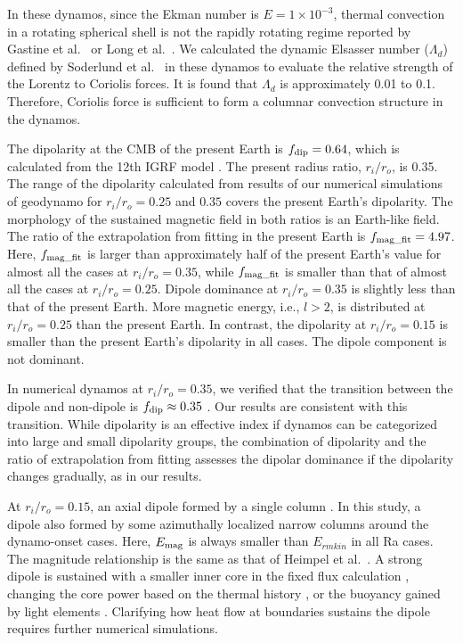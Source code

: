 {\color{red}
In these dynamos, since the Ekman number is $E = 1 \times 10^{-3}$, thermal convection in a rotating spherical shell is not the rapidly rotating regime reported by Gastine et al.\   or Long et al.\ . 
We calculated the dynamic Elsasser number ($\Lambda_d$) defined by Soderlund et al.\  in these dynamos to evaluate the relative strength of the Lorentz to Coriolis forces. 
It is found that $\Lambda_d$ is approximately 0.01 to 0.1. 
Therefore, Coriolis force is sufficient to form a columnar convection structure in the dynamos.
}

The dipolarity at the CMB of the present Earth is $f_{\rm dip} = 0.64$, which is calculated from the 12th IGRF model \cite{Thebault:2015}. 
The present radius ratio, $r_i/r_o$, is 0.35. 
The range of the dipolarity calculated from results of our numerical simulations of geodynamo for $r_i/r_o  = 0.25$ and $0.35$ covers the present Earth's dipolarity. 
The morphology of the sustained magnetic field in both ratios is an Earth-like field. 
The ratio of the extrapolation from fitting in the present Earth is $f_{\rm mag\_fit} = 4.97$. 
Here, $f_{\rm mag\_fit}$ is larger than approximately half of the present Earth's value for almost all the cases at $r_i/r_o = 0.35$, while $f_{\rm mag\_fit}$ is smaller than that of almost all the cases at $r_i/r_o = 0.25$. 
Dipole dominance at $r_i/r_o = 0.35$ is slightly less than that of the present Earth. 
More magnetic energy, i.e., $l > 2$, is distributed at $r_i/r_o = 0.25$ than the present Earth. 
In contrast, the dipolarity at $r_i/r_o = 0.15$ is smaller than the present Earth's dipolarity in all cases. 
The dipole component is not dominant.

In numerical dynamos at $r_i/r_o = 0.35$, we verified that the transition between the dipole and non-dipole is $f_{\rm dip} \approx 0.35$ \cite{Uli:2006,Olson:2011}.
Our results are consistent with this transition. 
While dipolarity is an effective index if dynamos can be categorized into large and small dipolarity groups, the combination of dipolarity and the ratio of extrapolation from fitting assesses the dipolar dominance if the dipolarity changes gradually, as in our results.

At $r_i/r_o =0.15$, an axial dipole formed by a single column \cite{Heimpel:2005}. 
In this study, a dipole also formed by some azimuthally localized narrow columns around the dynamo-onset cases. 
Here, $E_{\rm mag}$ is always smaller than $E_{rm kin}$ in all Ra cases. 
The magnitude relationship is the same as that of Heimpel et al.\ . 
A strong dipole is sustained with a smaller inner core in the fixed flux calculation \cite{Hori:2010}, changing the core power based on the thermal history \cite{Driscoll:2016}, or the buoyancy gained by light elements \cite{(Lhuillier:2019}.
Clarifying how heat flow at boundaries sustains the dipole requires further numerical simulations.

